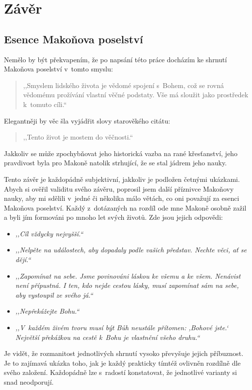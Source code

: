 \chapter{Závěr}

\section{Esence Makoňova poselství}

Nemělo by být překvapením, že po napsání této práce docházím ke shrnutí Makoňova
poselství v~tomto smyslu:
\begin{quote}
,,Smyslem lidského života je vědomé spojení s~Bohem,
což se rovná vědomému prožívání vlastní věčné podstaty. Vše má sloužit jako
prostředek k~tomuto cíli.``
\end{quote}
Elegantněji by věc šla vyjádřit slovy starověkého citátu:
\begin{quote}
,,Tento život je mostem do věčnosti.``
\end{quote}
Jakkoliv se může zpochybňovat jeho historická vazba na rané
křesťanství,\cite{dus2001neznama} jeho pravdivost byla pro Makoně natolik
strhující, že se stal jádrem jeho nauky.

Tento závěr je každopádně subjektivní, jakkoliv je podložen četnými ukázkami.
Abych si ověřil validitu svého závěru, poprosil jsem další příznivce Makoňovy
nauky, aby mi sdělili v~jedné či několika málo větách, co oni považují za esenci
Makoňova poselství. Každý z~dotázaných na rozdíl ode mne Makoně osobně zažil a
byli jím formováni po mnoho let svých životů. Zde jsou jejich odpovědi:

\begin{itemize}
  \item{\textit{,,Cíl vždycky nejvyšší.``}}
  \item{\textit{,,Nelpěte na událostech, aby dopadaly podle vašich představ. Nechte věci, ať
    se dějí.``}}
\item{\textit{,,Zapomínat na sebe. Jsme povinováni láskou ke všemu a ke všem. Nenávist
  není přípustná. I ten, kdo nejde cestou lásky, musí zapomínat sám na sebe, aby
    vystoupil ze svého já.``}}
  \item{\textit{,,Nepřekážejte Bohu.``}}
  \item{\textit{,,V~každém živém tvoru musí být Bůh neustále přítomen: ,Bohové jste.`
    Největší překážkou na cestě k~Bohu je vlastnění všeho druhu.``}}
\end{itemize}

Je vidět, že rozmanitost jednotlivých shrnutí vysoko převyšuje jejich
příbuznost. Je to zajímavá ukázka toho, jak je každý prakticky tímtéž ovlivněn
rozdílně dle svého založení. Každopádně lze s~radostí konstatovat, že jednotlivé
varianty si snad neodporují.

